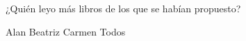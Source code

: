  ¿Quién leyo m\'as libros de los que se hab\'ian propuesto?

\begin{oneparchoices}
    \CorrectChoice Alan
    \choice Beatriz
    \choice Carmen
    \choice Todos
\end{oneparchoices}